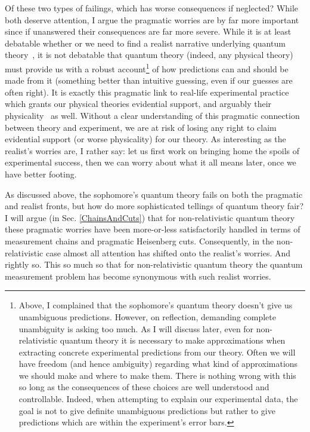 \documentclass[12pt,prd,superscriptaddress,floatfix,amsmath,amssymb,amsfonts,nofootinbib]{revtex4-2}
\begin{document}
Of these two types of failings, which has worse consequences if neglected? While both deserve attention, I argue the pragmatic worries are by far more important since if unanswered their consequences are far more severe. While it is at least debatable whether or we need to find a realist narrative underlying quantum theory~\cite{sep-qt-issues}, it is not debatable that quantum theory (indeed, any physical theory) must provide us with a robust account\footnote{Above, I complained that the sophomore's quantum theory doesn't give us unambiguous predictions. However, on reflection, demanding complete unambiguity is asking too much. As I will discuss later, even for non-relativistic quantum theory it is necessary to make approximations when extracting concrete experimental predictions from our theory. Often we will have freedom (and hence ambiguity) regarding what kind of approximations we should make and where to make them. There is nothing wrong with this so long as the consequences of these choices are well understood and controllable. Indeed, when attempting to explain our experimental data, the goal is not to give definite unambiguous predictions but rather to give predictions which are within the experiment's error bars.} of how predictions can and should be made from it (something better than intuitive guessing, even if our guesses are often right). It is exactly this pragmatic link to real-life experimental practice which grants our physical theories evidential support, and arguably their physicality~\cite{Curiel} as well. Without a clear understanding of this pragmatic connection between theory and experiment, we are at risk of losing any right to claim evidential support (or worse physicality) for our theory. As interesting as the realist's worries are, I rather say: let us first work on bringing home the spoils of experimental success, then we can worry about what it all means later, once we have better footing.

As discussed above, the sophomore's quantum theory fails on both the pragmatic and realist fronts, but how do more sophisticated tellings of quantum theory fair? I will argue (in Sec. \ref{ChainsAndCuts}) that for non-relativistic quantum theory these pragmatic worries have been more-or-less satisfactorily handled in terms of measurement chains and pragmatic Heisenberg cuts. Consequently, in the non-relativistic case almost all attention has shifted onto the realist's worries. And rightly so. This so much so that for non-relativistic quantum theory the quantum measurement problem has become synonymous with such realist worries.
\end{document}
